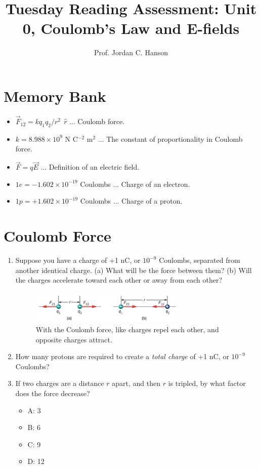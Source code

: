 \documentclass{article}
\begin{document}
\title{Tuesday Reading Assessment: Unit 0, Coulomb's Law and E-fields}
\author{Prof. Jordan C. Hanson}

\maketitle

\section{Memory Bank}

\begin{itemize}
\item $\vec{F}_{12} = k q_1 q_2 / r^2 ~~\hat{r}$ ... Coulomb force.
\item $k = 8.988 \times 10^{9}$ N C$^{-2}$ m$^{2}$ ... The constant of proportionality in Coulomb force.
\item $\vec{F} = q\vec{E}$ ... Definition of an electric field.
\item $1e = -1.602 \times 10^{-19}$ Coulombs ... Charge of an electron.
\item $1p = +1.602 \times 10^{-19}$ Coulombs ... Charge of a proton.
\end{itemize}

\section{Coulomb Force}

\begin{enumerate}
\item Suppose you have a charge of +1 nC, or $10^{-9}$ Coulombs, separated from another identical charge.  (a) What will be the force between them? (b) Will the charges accelerate toward each other or away from each other? \\ \vspace{2cm}
\begin{figure}[ht]
\centering
\includegraphics[width=0.7\textwidth]{Coul.png}
\caption{\label{fig:coul} With the Coulomb force, like charges repel each other, and opposite charges attract.}
\end{figure}
\item How many protons are required to create a \textit{total charge} of +1 nC, or $10^{-9}$ Coulombs? \\ \vspace{1cm}
\item If two charges are a distance $r$ apart, and then $r$ is tripled, by what factor does the force decrease?
\begin{itemize}
\item A: 3
\item B: 6
\item C: 9
\item D: 12
\end{itemize}
\end{enumerate}
\end{document}
